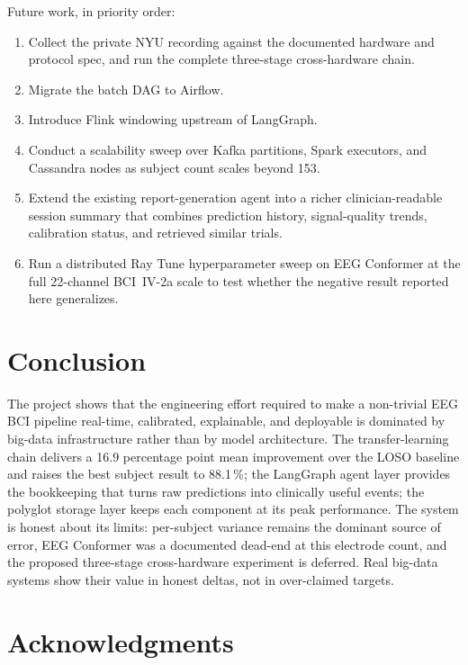 \documentclass[conference]{IEEEtran}
\begin{document}
Future work, in priority order:
\begin{enumerate}
\item Collect the private NYU recording against the documented hardware
      and protocol spec, and run the complete three-stage cross-hardware
      chain.
\item Migrate the batch DAG to Airflow.
\item Introduce Flink windowing upstream of LangGraph.
\item Conduct a scalability sweep over Kafka partitions, Spark executors,
      and Cassandra nodes as subject count scales beyond 153.
\item Extend the existing report-generation agent into a richer
      clinician-readable session summary that combines prediction history,
      signal-quality trends, calibration status, and retrieved similar trials.
\item Run a distributed Ray Tune hyperparameter sweep on EEG Conformer at
      the full 22-channel BCI~IV-2a scale to test whether the negative
      result reported here generalizes.
\end{enumerate}

\section{Conclusion}

The project shows that the engineering effort required to make a
non-trivial EEG BCI pipeline real-time, calibrated, explainable, and
deployable is dominated by big-data infrastructure rather than by model
architecture. The transfer-learning chain delivers a 16.9 percentage point
mean improvement over the LOSO baseline and raises the best subject result to
88.1\,\%; the LangGraph agent layer provides the bookkeeping that turns raw
predictions into clinically useful events; the polyglot storage layer keeps
each component at its peak performance. The system is honest about its limits:
per-subject
variance remains the dominant source of error, EEG Conformer was a
documented dead-end at this electrode count, and the proposed
three-stage cross-hardware experiment is deferred. Real big-data systems
show their value in honest deltas, not in over-claimed targets.

\section*{Acknowledgments}
\end{document}
